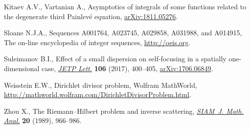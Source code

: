 \documentclass[pdftex]{sigma}
\numberwithin{equation}{section}
\begin{document}
\begin{thebibliography}{99}
Kitaev A.V., Vartanian A., Asymptotics of integrals of some functions related
 to the degenerate third {P}ainlev\'e equation, \href{https://arxiv.org/abs/1811.05276}{arXiv:1811.05276}.

Sloane N.J.A., {S}equences {A}001764, {A}023745, {A}029858, {A}031988, and
 {A}014915, {T}he on-line encyclopedia of integer sequences,
 \url{http://oeis.org}.

Suleimanov B.I., Effect of a small dispersion on self-focusing in a spatially
 one-dimensional case, \href{https://doi.org/10.1134/S0021364017180126}{\textit{JETP Lett.}} \textbf{106} (2017), 400--405,
 \href{https://arxiv.org/abs/1706.06849}{arXiv:1706.06849}.

Weisstein E.W., Dirichlet divisor problem, {W}olfram MathWorld,
 \url{http://mathworld.wolfram.com/DirichletDivisorProblem.html}.

Zhou X., The {R}iemann--{H}ilbert problem and inverse scattering,
 \href{https://doi.org/10.1137/0520065}{\textit{SIAM~J. Math. Anal.}} \textbf{20} (1989), 966--986.

\end{thebibliography}\LastPageEnding
\end{document}
